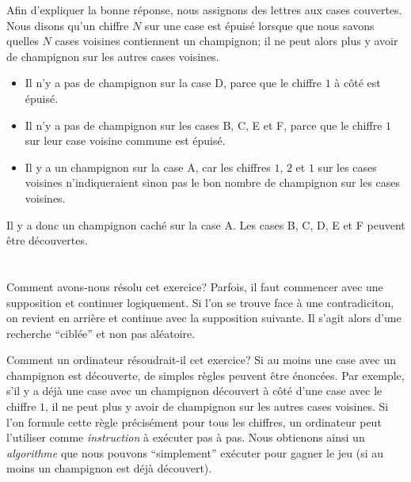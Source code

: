 {{{\centering%
\par}

Afin d’expliquer la bonne réponse, nous assignons des lettres aux cases couvertes. Nous disons qu’un chiffre ${N}$ sur une case est épuisé lorsque que nous savons quelles ${N}$ cases voisines contiennent un champignon; il ne peut alors plus y avoir de champignon sur les autres cases voisines.

{\centering%
\par}

\begin{itemize}
  \item Il n’y a pas de champignon sur la case D, parce que le chiffre $1$ à côté est épuisé.
  \item Il n’y a pas de champignon sur les cases B, C, E et F, parce que le chiffre $1$ sur leur case voisine commune est épuisé.
  \item Il y a un champignon sur la case A, car les chiffres $1$, $2$ et $1$ sur les cases voisines n’indiqueraient sinon pas le bon nombre de champignon sur les cases voisines.
\end{itemize}

{\centering%
\par}

Il y a donc un champignon caché sur la case A. Les cases B, C, D, E et F peuvent être découvertes.



\section*{\BrochureItsInformatics}
Comment avons-nous résolu cet exercice? Parfois, il faut commencer avec une supposition et continuer logiquement. Si l’on se trouve face à une contradiciton, on revient en arrière et continue avec la supposition suivante. Il s’agit alors d’une recherche “ciblée” et non pas aléatoire.

Comment un ordinateur résoudrait-il cet exercice? Si au moins une case avec un champignon est découverte, de simples règles peuvent être énoncées. Par exemple, s’il y a déjà une case avec un champignon découvert à côté d’une case avec le chiffre $1$, il ne peut plus y avoir de champignon sur les autres cases voisines. Si l’on formule cette règle précisément pour tous les chiffres, un ordinateur peut l’utiliser comme \emph{instruction} à exécuter pas à pas. Nous obtienons ainsi un \emph{algorithme} que nous pouvons “simplement” exécuter pour gagner le jeu (si au moins un champignon est déjà découvert).



}}
